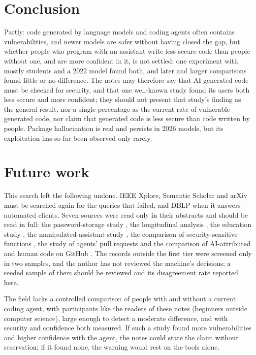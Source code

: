 \section{Conclusion}
\label{insecure-code:conclusion}

Partly: code generated by language models and coding agents often contains
vulnerabilities, and newer models are safer without having closed the gap,
but whether people who program with an assistant write less secure code
than people without one, and are more confident in it, is not settled: one
experiment with mostly students and a 2022 model found both, and later and
larger comparisons found little or no difference.
The notes may therefore say that AI-generated code must be checked for
security, and that one well-known study found its users both less secure
and more confident; they should not present that study's finding as the
general result, nor a single percentage as the current rate of vulnerable
generated code, nor claim that generated code is less secure than code
written by people.
Package hallucination is real and persists in 2026 models, but its
exploitation has so far been observed only rarely.

\section{Future work}
\label{insecure-code:future}

This search left the following undone.
IEEE Xplore, Semantic Scholar and arXiv must be searched again for the
queries that failed, and DBLP when it answers automated clients.
Seven sources were read only in their abstracts and should be read in full:
the password-storage study \autocite{Yardim2026Password}, the longitudinal
analysis \autocite{Cannavale2026Smarter}, the education study
\autocite{Yuan2025Mindset}, the manipulated-assistant study
\autocite{Serafini2025Manipulated}, the comparison of security-sensitive
functions \autocite{Lee2026HumanAI}, the study of agents' pull requests
\autocite{DectotLeMonnier2026Agentic} and the comparison of AI-attributed
and human code on GitHub \autocite{CaballeroIgnacio2026Trends}.
The records outside the first tier were screened only in two samples, and
the author has not reviewed the machine's decisions; a seeded sample of
them should be reviewed and its disagreement rate reported here.

The field lacks a controlled comparison of people with and without a current
coding agent, with participants like the readers of these notes (beginners
outside computer science), large enough to detect a moderate difference, and
with security and confidence both measured.
If such a study found more vulnerabilities and higher confidence with the
agent, the notes could state the claim without reservation; if it found
none, the warning would rest on the tools alone.

